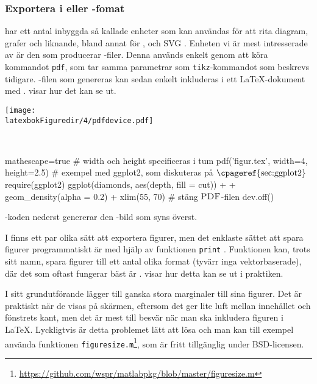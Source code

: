 \documentclass[lang=sv,ptsize=10pt,font=none,nomath,titles=bf,../../a4.tex]{subfiles}
\begin{document}
\subsubsection{Exportera i \PDF eller \PNG-fomat}

\Rlogo har ett antal inbyggda så kallade enheter  som kan
användas för att rita diagram, grafer och liknande, bland annat för \EPS,
\PNG och \textsc{SVG} \parencite[\ppno~675–676]{RCoreTeam12}. Enheten vi är mest
intresserade av är den som producerar \PDF-filer. Denna används enkelt
genom att köra kommandot \texttt{pdf}, som tar samma parametrar som
\texttt{tikz}-kommandot som beskrevs tidigare. \PDF-filen som genereras
kan sedan enkelt inkluderas i ett \LaTeX-dokument med .
 visar hur det kan se ut.

\begin{kod}[tbp]
	\centering
	\begin{minipage}{\textwidth}
		\centering
		\texttt{[image: \\latexbokFiguredir/4/pdfdevice.pdf]}
	\end{minipage}
	\\[1ex]
	\begin{minipage}{\textwidth}
		\begin{rcode*}{mathescape=true}
# width och height specificeras i tum
pdf('figur.tex', width=4, height=2.5)
# exempel med ggplot2, som diskuteras på $\text{\cpageref{sec:ggplot2}}$
require(ggplot2)
ggplot(diamonds, aes(depth, fill = cut)) +
  + geom_density(alpha = 0.2) + xlim(55, 70)
# stäng $\text{\textsc{PDF}}$-filen
dev.off()
		\end{rcode*}
	\end{minipage}
	\caption{\Rlogo-koden nederst genererar den \PDF-bild som
	syns överst.}
	\label{ex:pdfdevice}
\end{kod}

I \MATLAB finns ett par olika sätt att exportera figurer, men det
enklaste sättet att spara figurer programmatiskt är med hjälp av 
funktionen \texttt{print} \parencite{MATLAB13:print}. Funktionen kan,
trots sitt namn, spara figurer till ett antal olika format (tyvärr inga
vektorbaserade), där det som oftast fungerar bäst är \PNG.
 visar hur detta kan se ut i praktiken.

I sitt grundutförande lägger \MATLAB till ganska stora marginaler till
sina figurer. Det är praktiskt när de visas på skärmen, eftersom det ger
lite luft mellan innehållet och fönstrets kant, men det är mest till
besvär när man ska inkludera figuren i \LaTeX. Lyckligtvis är detta
problemet lätt att lösa \parencite{Robertson10} och man kan till exempel
använda funktionen \texttt{figuresize.m}\footnote{\url{https://github.com/wspr/matlabpkg/blob/master/figuresize.m}}, som är fritt tillgänglig under BSD-licensen.
\end{document}
